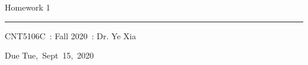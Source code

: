 \documentclass[fleqn]{article}
\newcommand{\myCourse}{CNT5106C}
\newcommand{\mySection}{Fall 2020}
\newcommand{\myTeacher}{Dr. Ye Xia}
\newcommand{\myAssignment}{Homework 1}
\newcommand{\myDueDate}{Tue,\ Sept\ 15,\ 2020}
\begin{document}
\title{\vspace{-1in}} %
\author{} %
\date{} %
\maketitle %

\usebox{\myTitleSignature}
\vspace{1in} %

{\centering \huge \myAssignment \par}
{\centering \noindent\rule{4in}{0.1pt} \par}
\vspace{0.05in}
{\centering \myCourse~: \mySection~: \myTeacher \par}
{\centering Due \myDueDate \par}
\vspace{1in}

\tableofcontents
\newpage

\end{document}
